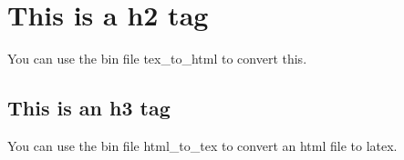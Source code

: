 \documentclass{article}
\begin{document}
\blogtitle{}
\blogsubtitle{}
\written{}
\updated{}

\section{This is a h2 tag}
You can use the bin file tex\_to\_html to convert this.


\subsection{This is an h3 tag}
You can use the bin file html\_to\_tex to convert an html file to latex.

\end{document}
